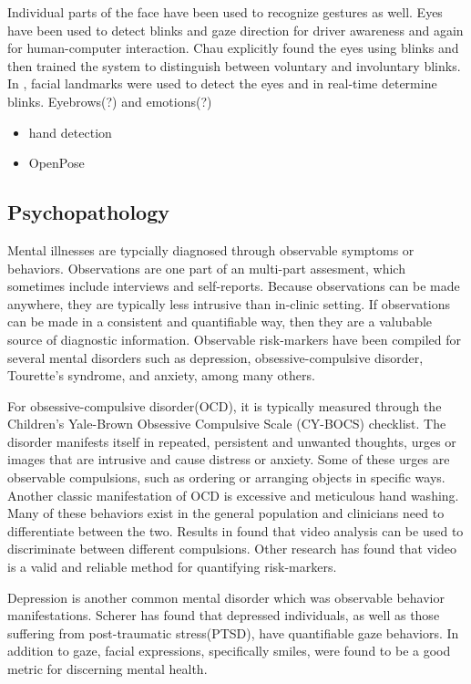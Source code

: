 \documentclass[11pt]{article}
\newcounter{list}
\begin{document}
Individual parts of the face have been used to recognize gestures as well. Eyes have been used to detect blinks and gaze direction for driver awareness and again for human-computer interaction. Chau\cite{chau2005} explicitly found the eyes using blinks and then trained the system to distinguish between voluntary and involuntary blinks. In \cite{soukupova2016}, facial landmarks were used to detect the eyes and in real-time determine blinks. Eyebrows(?) and emotions(?)\cite{nguyen2017}
\begin{itemize}
  \item \cite{kolsch2004} hand detection
  \item \cite{cao2016} OpenPose
\end{itemize}
\subsection{Psychopathology}
Mental illnesses are typcially diagnosed through observable symptoms or behaviors. Observations are one part of an multi-part assesment, which sometimes include interviews and self-reports. Because observations can be made anywhere, they are typically less intrusive than in-clinic setting. If observations can be made in a consistent and quantifiable way, then they are a valubable source of diagnostic information. Observable risk-markers have been compiled for several mental disorders such as depression, obsessive-compulsive disorder, Tourette's syndrome, and anxiety, among many others.

For obsessive-compulsive disorder(OCD), it is typically measured through the Children’s Yale-Brown Obsessive Compulsive Scale (CY-BOCS) checklist. The disorder manifests itself in repeated, persistent and unwanted thoughts, urges or images that are intrusive and cause distress or anxiety. Some of these urges are observable compulsions, such as ordering or arranging objects in specific ways\cite{radomsky2004}. Another classic manifestation of OCD is excessive and meticulous hand washing. Many of these behaviors exist in the general population and clinicians need to differentiate between the two.  Results in \cite{zor2011} found that  video analysis can be used to discriminate between different compulsions. Other research\cite{bernstein2017} has found that video is a valid and reliable method for quantifying risk-markers.

Depression is another common mental disorder which was observable behavior manifestations. Scherer\cite{scherer2014} has found that depressed individuals, as well as those suffering from post-traumatic stress(PTSD), have quantifiable gaze behaviors. In addition to gaze, facial expressions, specifically smiles, were found to be a good metric for discerning mental health.
\end{document}
